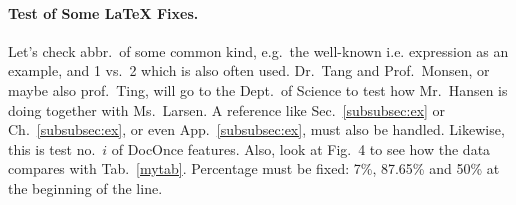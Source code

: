 \documentclass[%
oneside,                 %
final,                   %
10pt]{article}
\theoremstyle{definition}
\begin{document}
\begin{enumerate}
\paragraph{Test of Some {\LaTeX} Fixes.}
Let's check abbr.~of some common kind, e.g.~the well-known i.e.
expression as an example, and 1 vs.~2 which is also often used.
Dr.~Tang and Prof.~Monsen, or maybe also prof.~Ting,
will go to the Dept.~of Science to test how Mr.~Hansen is doing together
with Ms.~Larsen. A reference like Sec.~\vref{subsubsec:ex} or
Ch.~\vref{subsubsec:ex}, or even App.~\vref{subsubsec:ex}, must also be
handled. Likewise, this is test no.~$i$ of DocOnce features.
Also, look at Fig.~4 to see how the data compares with Tab.~\vref{mytab}.
Percentage must be fixed: 7\%,  87.65\% and
50\% at the beginning of the line.

\end{enumerate}
\end{document}
